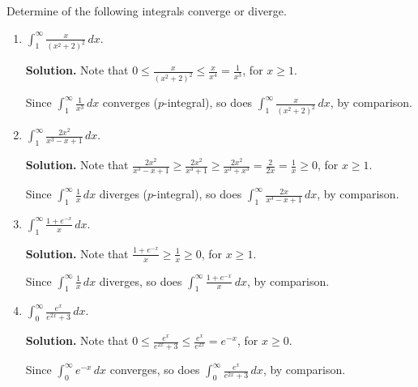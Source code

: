 \begin{Example}{}{}
    Determine of the following integrals converge or diverge.
    \begin{enumerate}[label=(\roman*)]
        \item $ \displaystyle \int_{1}^{\infty} \frac{x}{(x^2+2)^2}\, d{x} $.

              \textbf{Solution.} Note that
              $ \displaystyle  0\leqslant \frac{x}{(x^2+2)^2}\leqslant \frac{x}{x^4}=\frac{1}{x^3} $,
              for $ x\geqslant 1 $.

              Since $ \displaystyle \int_{1}^{\infty} \frac{1}{x^3} \, d{x}  $
              converges ($ p $-integral), so does $ \displaystyle \int_{1}^{\infty} \frac{x}{(x^2+2)^2} \, d{x} $,
              by comparison.
        \item $ \displaystyle \int_{1}^{\infty} \frac{2x^2}{x^3-x+1} \, d{x}  $.

              \textbf{Solution.} Note that
              $ \displaystyle \frac{2x^2}{x^3-x+1} \geqslant \frac{2x^2}{x^3+1} \geqslant \frac{2x^2}{x^3+x^3}=
                  \frac{2}{2x} =\frac{1}{x}\geqslant 0 $,
              for $ x\geqslant 1 $.

              Since $ \displaystyle \int_{1}^{\infty} \frac{1}{x} \, d{x}  $
              diverges ($ p $-integral), so does $ \displaystyle \int_{1}^{\infty} \frac{2x}{x^3-x+1} \, d{x} $,
              by comparison.
        \item $ \displaystyle \int_{1}^{\infty} \frac{1+e^{-x}}{x} \, d{x} $.

              \textbf{Solution.} Note that
              $ \displaystyle \frac{1+e^{-x}}{x} \geqslant \frac{1}{x} \geqslant 0 $,
              for $ x\geqslant 1 $.

              Since $ \displaystyle \int_{1}^{\infty} \frac{1}{x} \, d{x}  $ diverges,
              so does $ \displaystyle \int_{1}^{\infty} \frac{1+e^{-x}}{x} \, d{x}  $, by comparison.
        \item $ \displaystyle \int_{0}^{\infty} \frac{e^x}{e^{2x}+3} \, d{x}  $.

              \textbf{Solution.} Note that
              $ \displaystyle  0\leqslant \frac{e^{x}}{e^{2x}+3} \leqslant \frac{e^{x}}{e^{2x}} =e^{-x} $,
              for $ x\geqslant 0 $.

              Since $ \displaystyle \int_{0}^{\infty} e^{-x}\, d{x}  $ converges,
              so does $ \displaystyle \int_{0}^{\infty} \frac{e^{x}}{e^{2x}+3} \, d{x}  $, by comparison.
    \end{enumerate}
\end{Example}

